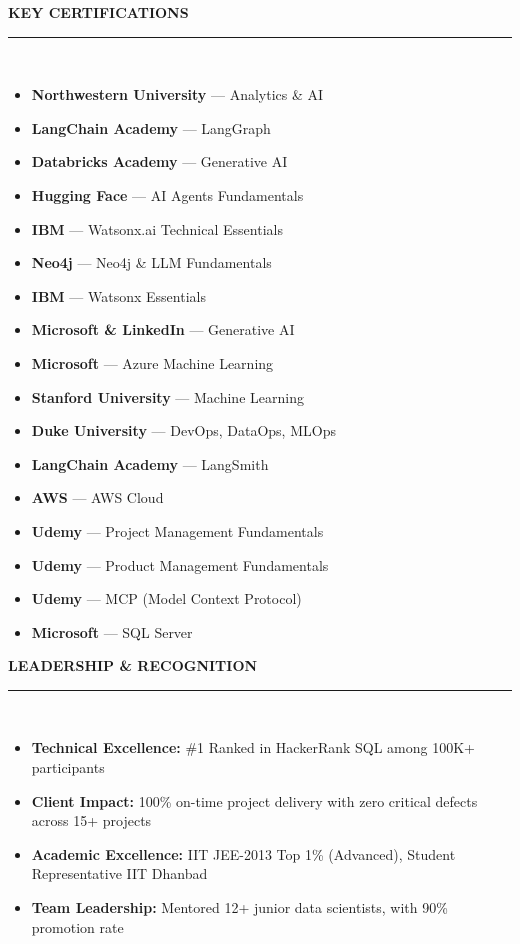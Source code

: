 \documentclass[a4paper,9pt]{article}
\newcommand{\cvsection}[2]{%
  \vspace{4pt}
  {\color{primary}\faIcon{#1}\hspace{6pt}\textbf{\fontsize{10pt}{12pt}\selectfont\uppercase{#2}}}\\[-2pt]
  \color{primary}\rule{\linewidth}{0.8pt}\\[-2pt]
  \color{textcolor}
}
\begin{document}
\begin{paracol}{2}
  \cvsection{certificate}{Key Certifications}
  \small
  \begin{itemize}
    \item \textbf{Northwestern University} --- Analytics \& AI
    \item \textbf{LangChain Academy} --- LangGraph
    \item \textbf{Databricks Academy} --- Generative AI
    \item \textbf{Hugging Face} --- AI Agents Fundamentals
    \item \textbf{IBM} --- Watsonx.ai Technical Essentials
    \item \textbf{Neo4j} --- Neo4j \& LLM Fundamentals
    \item \textbf{IBM} --- Watsonx Essentials
    \item \textbf{Microsoft \& LinkedIn} --- Generative AI
    \item \textbf{Microsoft} --- Azure Machine Learning
    \item \textbf{Stanford University} --- Machine Learning
    \item \textbf{Duke University} --- DevOps, DataOps, MLOps
    \item \textbf{LangChain Academy} --- LangSmith
    \item \textbf{AWS} --- AWS Cloud
    \item \textbf{Udemy} --- Project Management Fundamentals
    \item \textbf{Udemy} --- Product Management Fundamentals
    \item \textbf{Udemy} --- MCP (Model Context Protocol)
    \item \textbf{Microsoft} --- SQL Server
  \end{itemize}

  \cvsection{trophy}{Leadership \& Recognition}
  \small
  \begin{itemize}
    \item \textbf{Technical Excellence:} \#1 Ranked in HackerRank SQL among 100K+ participants
    \item \textbf{Client Impact:} 100\% on-time project delivery with zero critical defects across 15+ projects
    \item \textbf{Academic Excellence:} IIT JEE-2013 Top 1\% (Advanced), Student Representative IIT Dhanbad
    \item \textbf{Team Leadership:} Mentored 12+ junior data scientists, with 90\% promotion rate
  \end{itemize}


\end{paracol}
\end{document}
